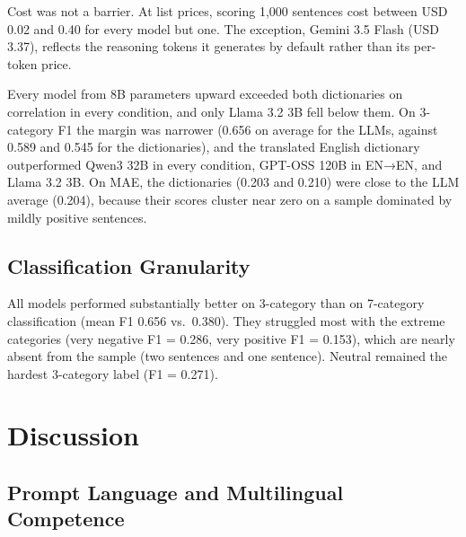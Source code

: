 \documentclass[
  man,
  floatsintext,
  longtable,
  nolmodern,
  notxfonts,
  notimes,
  colorlinks=true,linkcolor=blue,citecolor=blue,urlcolor=blue]{apa7}
\begin{document}
Cost was not a barrier. At list prices, scoring 1,000 sentences cost
between USD 0.02 and 0.40 for every model but one. The exception, Gemini
3.5 Flash (USD 3.37), reflects the reasoning tokens it generates by
default rather than its per-token price.

Every model from 8B parameters upward exceeded both dictionaries on
correlation in every condition, and only Llama 3.2 3B fell below them.
On 3-category F1 the margin was narrower (0.656 on average for the LLMs,
against 0.589 and 0.545 for the dictionaries), and the translated
English dictionary outperformed Qwen3 32B in every condition, GPT-OSS
120B in EN→EN, and Llama 3.2 3B. On MAE, the dictionaries (0.203 and
0.210) were close to the LLM average (0.204), because their scores
cluster near zero on a sample dominated by mildly positive sentences.

\subsection{Classification
Granularity}\label{classification-granularity}

All models performed substantially better on 3-category than on
7-category classification (mean F1 0.656 vs.~0.380). They struggled most
with the extreme categories (very negative F1 = 0.286, very positive F1
= 0.153), which are nearly absent from the sample (two sentences and one
sentence). Neutral remained the hardest 3-category label (F1 = 0.271).

\section{Discussion}\label{discussion}

\subsection{Prompt Language and Multilingual
Competence}\label{prompt-language-and-multilingual-competence}
\end{document}
